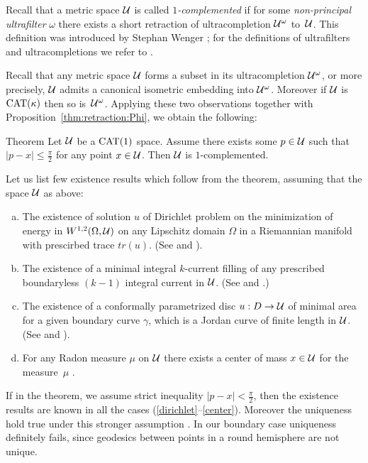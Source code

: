 \documentclass[oneside,a4paper, 12pt]{article}
\begin{document}
Recall that a metric space ${\mathcal{U}}$ is called \emph{$1$-complemented} if for some \emph{non-principal ultrafilter} $\omega$  there exists a short retraction of ultracompletion ${\mathcal{U}}^{\omega}$ to~${\mathcal{U}}$.
This definition was introduced by Stephan Wenger \cite{Wenger-1comp};
for the definitions of ultrafilters and ultracompletions we refer to \cite{Wenger-1comp,guo-wenger,akp}. 

Recall that any metric space ${\mathcal{U}}$ forms a subset in its ultracompletion ${\mathcal{U}}^{\omega}$, or more precisely, ${\mathcal{U}}$ admits a canonical isometric embedding into ${\mathcal{U}}^{\omega}$.
Moreover if ${\mathcal{U}}$ is $\mathrm{CAT}(\kappa)$ then so is~${\mathcal{U}}^\omega$. 
Applying these two observations together with Proposition~\ref{thm:retraction:Phi}, we obtain  the following:

\begin{thm}{Theorem}\label{thm:complemented}
Let ${\mathcal{U}}$ be  a $\mathrm{CAT}(1)$ space.
Assume  there exists some $p\in {\mathcal{U}}$ such that $|p-x|\le \tfrac\pi2$ for any point $x\in {\mathcal{U}}$.
Then ${\mathcal{U}}$ is $1$-complemented.
\end{thm}

Let us list few existence results which follow from the theorem, assuming that the space ${\mathcal{U}}$ as above:
\begin{enumerate}[(a)]
\item\label{dirichlet}   The existence of solution $u$ of Dirichlet problem on the minimization of energy 
in $W^{1,2} (\Omega, {\mathcal{U}})$ on any Lipschitz domain $\Omega$ in a Riemannian manifold with prescirbed trace $tr(u)$.
(See \cite{KS} and \cite[Theorem 1.4]{guo-wenger}).
\item The existence of a minimal integral $k$-current filling of any prescribed boundaryless $(k-1)$ integral current in ${\mathcal{U}}$. 
(See \cite{Ambrosio} and \cite[Theorem 3.3]{Wenger-1comp}.)
\item   The existence of a conformally parametrized disc $u:D\to {\mathcal{U}}$ of minimal area for a given boundary curve $\gamma$, which is a Jordan curve of finite length in ${\mathcal{U}}$.
(See \cite{LWplateau} and \cite[Theorem 1.2]{guo-wenger}).
\item\label{center} For any Radon measure $\mu$ on ${\mathcal{U}}$ there exists a center of mass $x\in {\mathcal{U}}$ for the measure~$\mu$ \cite{Sturm, yokota}.
\end{enumerate}

If in the theorem, we assume strict inequality $|p-x|< \tfrac\pi2$, then the existence results are known  in all the cases (\ref{dirichlet}--\ref{center}).
Moreover the uniqueness hold true under this stronger assumption
\cite{yokota,serbinowski}.
In our boundary case uniqueness definitely fails, since geodesics between points in a round hemisphere are not unique.
\end{document}
